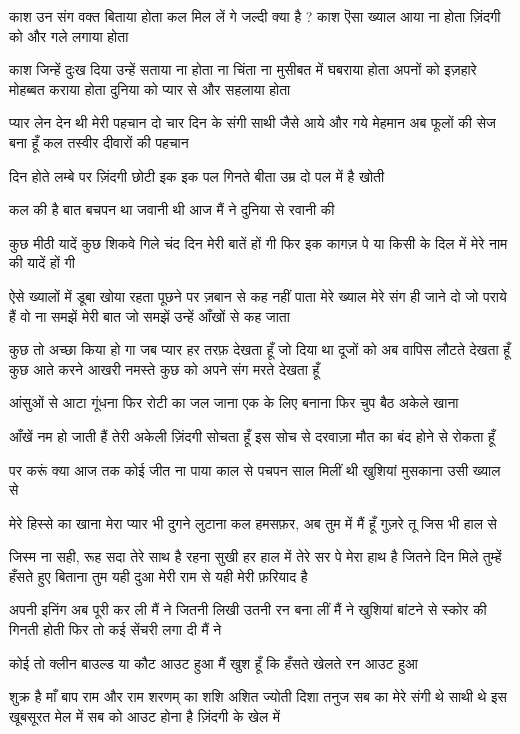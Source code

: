 काश उन संग वक्त बिताया होता
कल मिल लें गे जल्दी क्या है ?
काश ऎसा ख्याल आया ना होता
ज़िंदगी को और गले लगाया होता

काश जिन्हें दुःख दिया उन्हें सताया ना होता
ना चिंता ना मुसीबत में घबराया होता
अपनों को इज़हारे मोहब्बत कराया होता
दुनिया को प्यार से और सहलाया होता


प्यार लेन देन थी मेरी पहचान
दो चार दिन के संगी साथी
जैसे आये और गये मेहमान
अब फूलों की सेज बना हूँ
कल तस्वीर दीवारों की पहचान

दिन होते लम्बे पर ज़िंदगी छोटी
इक इक पल गिनते बीता
उम्र दो पल में है खोती


कल की है बात बचपन था जवानी थी
आज मैं ने दुनिया से रवानी की

कुछ मीठी यादें कुछ शिकवे गिले
चंद दिन मेरी बातें हों गी
फिर इक कागज़ पे या किसी के दिल में
मेरे नाम की यादें हों गी




ऐसे ख्यालों में डूबा खोया रहता
पूछने पर ज़बान से कह नहीं पाता
मेरे ख्याल मेरे संग ही जाने दो
जो पराये हैं वो ना समझें मेरी बात
जो समझें उन्हें आँखों से कह जाता

कुछ तो अच्छा किया हो गा
जब प्यार हर तरफ़ देखता हूँ
जो दिया था दूजों को
अब वापिस लौटते देखता हूँ
कुछ आते करने आखरी नमस्ते
कुछ को अपने संग मरते देखता हूँ

आंसुओं से आटा गूंधना
फिर रोटी का जल जाना
एक के लिए बनाना
फिर चुप बैठ अकेले खाना




आँखें नम हो जाती हैं
तेरी अकेली ज़िंदगी सोचता हूँ
इस सोच से दरवाज़ा मौत का
बंद होने से रोकता हूँ

पर करूं क्या आज तक
कोई जीत ना पाया काल से
पचपन साल मिलीं थी खुशियां
मुसकाना उसी ख्याल से


मेरे हिस्से का खाना मेरा प्यार भी दुगने लुटाना
कल हमसफ़र, अब तुम में मैं हूँ
गुज़रे तू जिस भी हाल से

जिस्म ना सही, रूह सदा तेरे साथ है
रहना सुखी हर हाल में तेरे सर पे मेरा हाथ है
जितने दिन मिले तुम्हें हँसते हुए बिताना तुम
यही दुआ मेरी राम से यही मेरी फ़रियाद है



अपनी इनिंग अब पूरी कर ली मैं ने
जितनी लिखी उतनी रन बना लीं मैं ने
खुशियां बांटने से स्कोर की गिनती होती
फिर तो कई सेंचरी लगा दी मैं ने

कोई तो क्लीन बाउल्ड या कौट आउट हुआ
मैं खुश हूँ कि हँसते खेलते रन आउट हुआ




शुक्र है माँ बाप राम और राम शरणम् का
शशि अशित ज्योती दिशा तनुज सब का
मेरे संगी थे साथी थे इस खूबसूरत मेल में
सब को आउट होना है ज़िंदगी के खेल में

